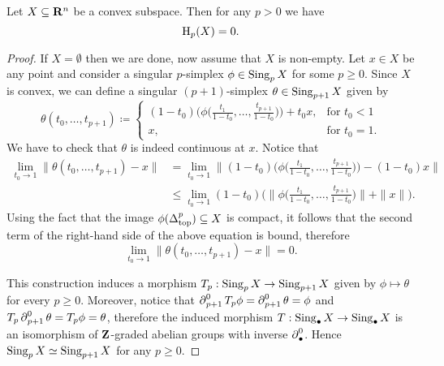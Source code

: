 \begin{theorem}
\label{thm:convex-space-Rn-zero-homology}
Let \(X \subseteq \mathbf{R}^n\) be a convex subspace. Then for any \(p > 0\) we have
\[
\operatorname{H}_p(X) = 0.
\]
\end{theorem}

\begin{proof}
If \(X = \emptyset\) then we are done, now assume that \(X\) is non-empty. Let \(x \in X\)
be any point and consider a singular \(p\)-simplex \(\phi \in \operatorname{Sing}_p X\) for some
\(p \geq 0\). Since \(X\) is convex, we can define a singular \((p+1)\)-simplex \(\theta
\in \operatorname{Sing}_{p+1} X\) given by
\[
\theta(t_0, \dots, t_{p+1}) \coloneq
\begin{cases}
  (1 - t_0) \Big(\phi\Big( \frac{t_{1}}{1 - t_{0}}, \dots, \frac{t_{p+1}}{1 - t_0}
  \Big)\Big) + t_0 x, &\text{for } t_0 < 1 \\
  x, &\text{for } t_0 = 1.
\end{cases}
\]
We have to check that \(\theta\) is indeed continuous at \(x\). Notice that
\begin{align*}
  \lim_{t_0 \to 1} \| \theta(t_0, \dots, t_{p+1}) - x \|
  &= \lim_{t_0 \to 1} \Big\| (1 - t_0)
  \Big(\phi\Big( \frac{t_{1}}{1 - t_{0}}, \dots, \frac{t_{p+1}}{1 - t_0} \Big)\Big)
  - (1 - t_0) x
  \Big\| \\
  &\leq \lim_{t_0 \to 1} (1 - t_0) \Big( \Big\|
    \phi\Big( \frac{t_{1}}{1 - t_{0}}, \dots, \frac{t_{p+1}}{1 - t_0} \Big)
    \Big\|
    + \| x \|
    \Big).
\end{align*}
Using the fact that the image \(\phi(\Delta_{\text{top}}^p) \subseteq X\) is compact, it follows that
the second term of the right-hand side of the above equation is bound, therefore
\[
\lim_{t_0 \to 1} \| \theta(t_{0}, \dots, t_{p+1}) - x \| = 0.
\]

This construction induces a morphism \(T_p: \operatorname{Sing}_p X \to \operatorname{Sing}_{p+1} X\) given by
\(\phi \mapsto \theta\) for every \(p \geq 0\). Moreover, notice that
\(\operatorname{\partial}_{p+1}^0 T_p \phi = \operatorname{\partial}_{p+1}^0 \theta = \phi\) and
\(T_p \operatorname{\partial}_{p+1}^0 \theta = T_p \phi = \theta\), therefore the induced morphism
\(T: \operatorname{Sing}_{\bullet} X \to \operatorname{Sing}_{\bullet} X\) is an isomorphism of
\(\mathbf{Z}\)-graded abelian groups with inverse \(\operatorname{\partial}_{\bullet}^0\). Hence
\(\operatorname{Sing}_p X \simeq \operatorname{Sing}_{p + 1} X\) for any \(p \geq 0\).


\end{proof}
